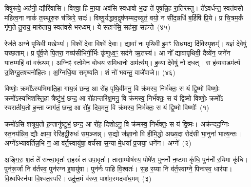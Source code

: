 विषु॑रूपे॒ अह॑नी॒ द्यौरि॑वासि। विश्वा॒ हि मा॒या अव॑सि स्वधावो भ॒द्रा ते॑ पूषन्नि॒ह रा॒तिर॑स्तु। ते॑\-ऽवर्धन्त॒ स्वत॑वसो महित्व॒ना नाकं॑ त॒स्थुरु॒रु च॑क्रिरे॒ सदः॑। विष्णु॒र्यद्धाव॒द्वृष॑णम्मद॒च्युतं॒ वयो॒ न सी॑द॒न्नधि॑ ब॒र्\mbox{}हिषि॑ प्रि॒ये। प्र चि॒त्रम॒र्कं गृ॑ण॒ते तु॒राय॒ मारु॑ताय॒ स्वत॑वसे भरध्वम्। ये सहाꣳ॑सि॒ सह॑सा॒ सह॑न्ते~(४५)

रेज॑ते अग्ने पृथि॒वी म॒खेभ्यः॑। विश्वे॑ दे॒वा विश्वे॑ देवाः। द्यावा॑ नः पृथि॒वी इ॒मꣳ सि॒ध्रम॒द्य दि॑वि॒स्पृशम्᳚। य॒ज्ञं दे॒वेषु॑ यच्छताम्। प्र पू᳚र्व॒जे पि॒तरा॒ नव्य॑सीभिर्गी॒र्भिः कृ॑णुध्व॒ꣳ॒ सद॑ने ऋ॒तस्य॑। आ नो᳚ द्यावापृथिवी॒ दैव्ये॑न॒ जने॑न यात॒म्महि॑ वां॒ वरू॑थम्। अ॒ग्निꣴ स्तोमे॑न बोधय समिधा॒नो अम॑र्त्यम्। ह॒व्या दे॒वेषु॑ नो दधत्। स ह॑व्य॒वाडम॑र्त्य उ॒शिग्दू॒तश्चनो॑हितः। अ॒ग्निर्धि॒या समृ॑ण्वति। शं नो॑ भवन्तु॒ वाजे॑वाजे॥~(४६)

{\anuvakamend[{पू॒रु॒ष॒त्वता॑ यज॒तन्ते॑ अ॒न्यथ्सह॑न्ते॒ चनो॑हितो॒\-ऽष्टौ च॑}]}%


{\anuvakamend[{विष्णोः॒ क्रमो॑\-ऽसि दि॒वस्पर्यन्न॑प॒ते\-ऽपे॑त॒ समि॑तं॒ या जा॒ता मा नो॑ हिꣳसीद्ध्रु॒वा\-ऽस्या॑दि॒त्यङ्गर्भ॒मिन्द्रा᳚ग्नी रोच॒नैका॑\-दश}]}%

{}

\setcounter{anuvakam}{0}
विष्णोः॒ क्रमो᳚\-ऽस्यभिमाति॒हा गा॑य॒त्रं छन्द॒ आ रो॑ह पृथि॒वीमनु॒ वि क्र॑मस्व॒ निर्भ॑क्तः॒ स यं द्वि॒ष्मो विष्णोः॒ क्रमो᳚\-ऽस्यभिशस्ति॒हा त्रैष्टु॑भं॒ छन्द॒ आ रो॑हा॒न्तरि॑क्ष॒मनु॒ वि क्र॑मस्व॒ निर्भ॑क्तः॒ स यं द्वि॒ष्मो विष्णोः॒ क्रमो᳚\-ऽ स्यरातीय॒तो ह॒न्ता जाग॑तं॒ छन्द॒ आ रो॑ह॒ दिव॒मनु॒ वि क्र॑मस्व॒ निर्भ॑क्तः॒ स यं द्वि॒ष्मो विष्णोः᳚~(१)

क्रमो॑\-ऽसि शत्रूय॒तो ह॒न्तानु॑ष्टुभं॒ छन्द॒ आ रो॑ह॒ दिशो\-ऽनु॒ वि क्र॑मस्व॒ निर्भ॑क्तः॒ स यं द्वि॒ष्मः। अक्र॑न्दद॒ग्निः स्त॒नय॑न्निव॒ द्यौः क्षामा॒ रेरि॑हद्वी॒रुधः॑ सम॒ञ्जन्न्। स॒द्यो ज॑ज्ञा॒नो वि हीमि॒द्धो अख्य॒दा रोद॑सी भा॒नुना॑ भात्य॒न्तः। अग्ने᳚\-ऽभ्यावर्तिन्न॒भि न॒ आ व॑र्त॒स्वायु॑षा॒ वर्च॑सा स॒न्या मे॒धया᳚ प्र॒जया॒ धने॑न। अग्ने᳚~(२)

अ॒ङ्गि॒रः॒ श॒तं ते॑ सन्त्वा॒वृतः॑ स॒हस्रं॑ त उपा॒वृतः॑। तासा॒म्पोष॑स्य॒ पोषे॑ण॒ पुन॑र्नो न॒ष्टमा कृ॑धि॒ पुन॑र्नो र॒यिमा कृ॑धि। पुन॑रू॒र्जा नि व॑र्तस्व॒ पुन॑रग्न इ॒षायु॑षा। पुन॑र्नः पाहि वि॒श्वतः॑। स॒ह र॒य्या नि व॑र्त॒स्वाग्ने॒ पिन्व॑स्व॒ धार॑या। वि॒श्वफ्स्नि॑या वि॒श्वत॒स्परि॑। उदु॑त्त॒मं व॑रुण॒ पाश॑म॒स्मदवा॑ध॒मम्~(३)

